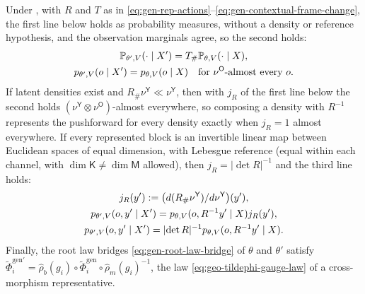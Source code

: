 Under , with $R$ and $T$ as in
\eqref{eq:gen-rep-actions}--\eqref{eq:gen-contextual-frame-change}, the first line below holds as
probability measures, without a density or reference hypothesis, and the observation marginals agree, so
the second holds:
\begin{gather}
\mathbb P_{\theta',V}(\cdot\mid X')=T_\#\mathbb P_{\theta,V}(\cdot\mid X),
\label{eq:gen-gauge-joint-pushforward}\\
p_{\theta',V}(o\mid X')=p_{\theta,V}(o\mid X)
\quad\text{for }\nu^{\mathsf O}\text{-almost every }o.
\label{eq:gen-gauge-evidence-invariance}
\end{gather}
If latent densities exist and $R_\#\nu^{\mathsf Y}\ll\nu^{\mathsf Y}$, then with $j_R$ of the first line
below the second holds $(\nu^{\mathsf Y}\otimes\nu^{\mathsf O})$-almost everywhere, so composing a density
with $R^{-1}$ represents the pushforward for every density exactly when $j_R=1$ almost everywhere. If every
represented block is an invertible linear map between Euclidean spaces of equal dimension, with Lebesgue
reference (equal within each channel, with $\dim\mathsf K\neq\dim\mathsf M$ allowed), then
$j_R=\lvert\det R\rvert^{-1}$ and the third line holds:
\begin{gather}
j_R(y'):=\bigl(d(R_\#\nu^{\mathsf Y})/d\nu^{\mathsf Y}\bigr)(y'),
\label{eq:gen-gauge-reference-rn}\\
p_{\theta',V}(o,y'\mid X')=p_{\theta,V}(o,R^{-1}y'\mid X)j_R(y'),
\label{eq:gen-gauge-rn-density}\\
p_{\theta',V}(o,y'\mid X')=\lvert\det R\rvert^{-1}p_{\theta,V}(o,R^{-1}y'\mid X).
\label{eq:gen-gauge-lebesgue-density}
\end{gather}
Finally, the root law bridges \eqref{eq:gen-root-law-bridge} of $\theta$ and $\theta'$ satisfy
$\widetilde\Phi^{\mathrm{gen}\prime}_i=\widehat\rho_b(g_i)\circ\widetilde\Phi^{\mathrm{gen}}_i\circ\widehat\rho_m(g_i)^{-1}$,
the law \eqref{eq:geo-tildephi-gauge-law} of a cross-morphism representative. 

